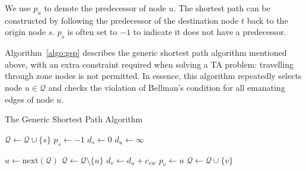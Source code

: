 We use $p_u$ to denote the predecessor of node $u$.
The shortest path can be constructed by following the predecessor of the destination node $t$ back to the origin node $s$. $p_s$ is often set to $-1$ to indicate it does not have a predecessor.

\begin{comment}
\begin{figure}
    \centering
    \tikzstyle{main node} = [circle, draw, text centered, minimum height=2.5em]
    \tikzstyle{line} = [->, draw]
    \begin{tikzpicture}[>=stealth', line width=1pt, auto, node distance=3cm]
        \node [main node] (u)  {u};
        \node [main node] (v) [right of=u] {v};
        \node [main node] (o) [below left of=u, yshift=1cm]  {};
        \node [main node] (d) [below right of=v, yshift=1cm] {};

        \node [above] at (u.north) {$du$};
        \node [above] at (v.north) {$dv = du + c_{vw}$};

        \path [line] (u) -- (v);
        \path [line] (o) -- (u);
        \path [line] (v) -- (d);
    \end{tikzpicture}
    \caption{}
    \label{}
\end{figure}
\end{comment}

Algorithm~\ref{algo:gsp} \citep{Klunder} describes the generic shortest path algorithm mentioned above,
with an extra constraint required when solving a TA problem: travelling through zone nodes is not permitted.
In essence, this algorithm repeatedly selects node $u\in\mathcal{Q}$ and checks the violation of Bellman's condition for all emanating edges of node $u$.
\begin{algorithm}
    \caption{The Generic Shortest Path Algorithm}
    \label{algo:gsp}
    \begin{algorithmic}[1]
        \State $\mathcal{Q} \gets \mathcal{Q} \cup \{s\}$ 
        \State $p_s \gets -1$ 
        \State $d_s \gets 0$
         
        \State $d_u \gets \infty$
    \EndFor

    \State $ u \gets \text{next}(\mathcal{Q}) $ 
    \State $ \mathcal{Q} \gets \mathcal{Q} \setminus \{u\} $
     
    \State $d_v \gets d_u + c_{vw}$
    \State $p_v \gets u$
    \State $\mathcal{Q} \gets \mathcal{Q} \cup \{v\}$ 
\EndIf
                    \EndIf
                \EndFor
            \EndIf
        \EndWhile
    \EndProcedure
\end{algorithmic}
\end{algorithm}

